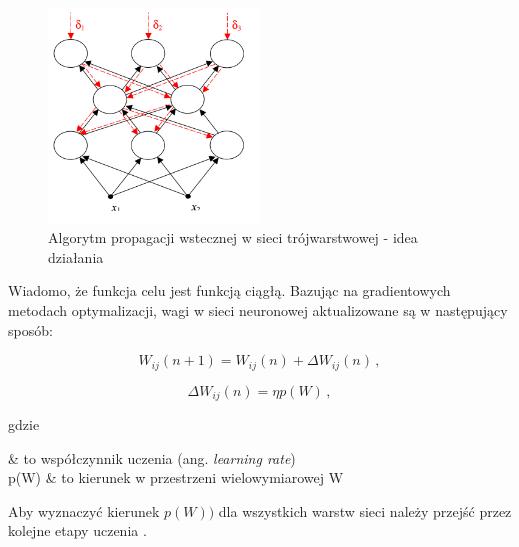 \documentclass[twoside]{iisthesis}
\begin{document}
		 \begin{figure}[!ht] 
	 		 	\centering
	 		 	\includegraphics[width=0.5\textwidth]{ilustracjabackprop}
	 		 	\caption{Algorytm propagacji wstecznej w sieci trójwarstwowej - idea działania \protect\cite{kwateralgorytmy}}
	 		 	\label{fig:ilustracjabackprop}
		 \end{figure}
		 
		 Wiadomo, że funkcja celu jest funkcją ciągłą. Bazując na gradientowych metodach optymalizacji, wagi w sieci neuronowej aktualizowane są w następujący sposób:	 
		 
 		 \begin{equation}
 		 \label{eq:weightadaptation3}
 		 W_{ij}(n+1) = W_{ij}(n) + \Delta W_{ij}(n) 
 		 \,,
 		 \end{equation}
 		 
 		 
 		 \begin{equation}
 		 \label{eq:weightadaptation2}
 		 \Delta W_{ij}(n) = \eta p(W)
 		 \,,
 		 \end{equation}
		 
		 gdzie
		 
		 \begin{conditions*}
		 	\eta & to współczynnik uczenia (ang. \textit{learning rate}) \\
		 	p(W) & to kierunek w przestrzeni wielowymiarowej W 
		 \end{conditions*} 
		 
		 Aby wyznaczyć kierunek $p(W))$ dla wszystkich warstw sieci należy przejść przez kolejne etapy uczenia \cite{haykin1994neural}\cite{osowski1996sieci}\cite{kwateralgorytmy}\cite{hertz1993wstkep}\cite{timothy1996sieci}.
		 
\end{document}
